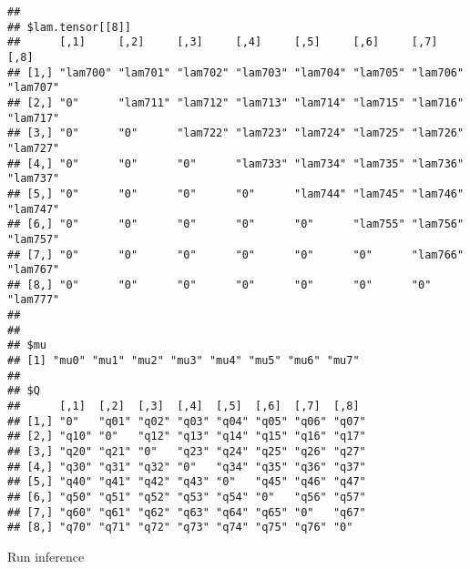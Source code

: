 \documentclass[
]{article}
\newenvironment{Shaded}{\begin{snugshade}}{\end{snugshade}}
\newcommand{\CommentTok}[1]{\textcolor[rgb]{0.56,0.35,0.01}{\textit{#1}}}
\begin{document}
\begin{verbatim}
## 
## $lam.tensor[[8]]
##      [,1]     [,2]     [,3]     [,4]     [,5]     [,6]     [,7]     [,8]    
## [1,] "lam700" "lam701" "lam702" "lam703" "lam704" "lam705" "lam706" "lam707"
## [2,] "0"      "lam711" "lam712" "lam713" "lam714" "lam715" "lam716" "lam717"
## [3,] "0"      "0"      "lam722" "lam723" "lam724" "lam725" "lam726" "lam727"
## [4,] "0"      "0"      "0"      "lam733" "lam734" "lam735" "lam736" "lam737"
## [5,] "0"      "0"      "0"      "0"      "lam744" "lam745" "lam746" "lam747"
## [6,] "0"      "0"      "0"      "0"      "0"      "lam755" "lam756" "lam757"
## [7,] "0"      "0"      "0"      "0"      "0"      "0"      "lam766" "lam767"
## [8,] "0"      "0"      "0"      "0"      "0"      "0"      "0"      "lam777"
## 
## 
## $mu
## [1] "mu0" "mu1" "mu2" "mu3" "mu4" "mu5" "mu6" "mu7"
## 
## $Q
##      [,1]  [,2]  [,3]  [,4]  [,5]  [,6]  [,7]  [,8] 
## [1,] "0"   "q01" "q02" "q03" "q04" "q05" "q06" "q07"
## [2,] "q10" "0"   "q12" "q13" "q14" "q15" "q16" "q17"
## [3,] "q20" "q21" "0"   "q23" "q24" "q25" "q26" "q27"
## [4,] "q30" "q31" "q32" "0"   "q34" "q35" "q36" "q37"
## [5,] "q40" "q41" "q42" "q43" "0"   "q45" "q46" "q47"
## [6,] "q50" "q51" "q52" "q53" "q54" "0"   "q56" "q57"
## [7,] "q60" "q61" "q62" "q63" "q64" "q65" "0"   "q67"
## [8,] "q70" "q71" "q72" "q73" "q74" "q75" "q76" "0"
\end{verbatim}

\begin{Shaded}
\end{Shaded}

Run inference
\end{document}
